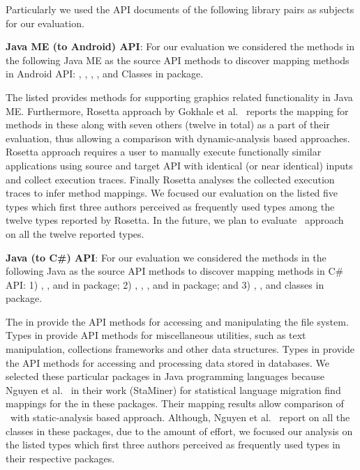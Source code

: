 Particularly we used the API documents of the following library pairs as subjects for our evaluation. 


\textbf{Java ME (to Android) API}:
For our evaluation we considered the methods in the following Java ME  as the source API methods to discover mapping methods in Android API: 
,
,
,
, and
Classes in  package.


The listed  provides methods for supporting graphics related functionality in Java ME.
Furthermore, Rosetta approach by Gokhale et al.~\cite{Gokhale2013ICSE} reports the
mapping for methods in these  along with seven others (twelve  in total) as a part of their evaluation,
thus allowing a comparison with dynamic-analysis based approaches.
Rosetta approach requires a user to manually execute functionally similar applications using source and target API with identical (or near identical) inputs and collect execution traces.
Finally Rosetta analyses the collected execution traces to infer method mappings.
We focused our evaluation on the listed five types which first three authors perceived as frequently used types among the twelve types reported by Rosetta.
In the future, we plan to evaluate \tool\ approach on all the twelve reported types. 

\textbf{Java (to C\#) API}:
For our evaluation we considered the methods in the following Java  as the source API methods to discover mapping methods in C\# API: 
1) ,
, and 
 in  package;
2) ,
,
, and 
 in  package; and
3) ,
, and 
 classes in  package.
 
The  in  provide the API methods for accessing and manipulating the file system.
Types in  provide API methods for miscellaneous utilities, such as text manipulation, collections frameworks and other data structures.
Types in  provide the API methods for accessing and processing data stored in databases.
We selected these particular packages in Java programming languages because Nguyen et al.~\cite{nguyen2014statistical} in their work (StaMiner) for statistical language migration find mappings for the  in these packages.
Their mapping results allow comparison of \tool\ with static-analysis based approach.
Although, Nguyen et al.~\cite{nguyen2014statistical} report on all the classes in these packages,
due to the amount of effort, we focused our analysis on the listed types which first three authors perceived as frequently used types in their respective packages.


